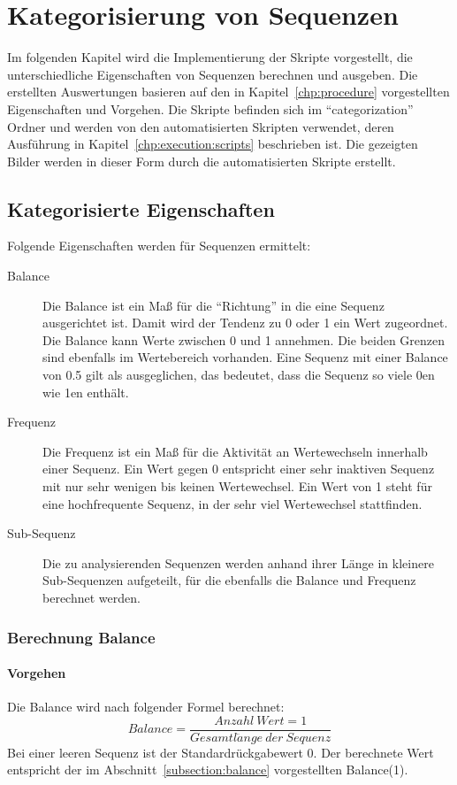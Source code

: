 \chapter{Kategorisierung von Sequenzen}
\label{chp:categorization}
Im folgenden Kapitel wird die Implementierung der Skripte vorgestellt, die unterschiedliche Eigenschaften von Sequenzen berechnen und ausgeben.
Die erstellten Auswertungen basieren auf den in Kapitel~\ref{chp:procedure} vorgestellten Eigenschaften und Vorgehen.
Die Skripte befinden sich im \enquote{categorization} Ordner und werden von den automatisierten Skripten verwendet, deren Ausführung in Kapitel~\ref{chp:execution:scripts} beschrieben ist.
Die gezeigten Bilder werden in dieser Form durch die automatisierten Skripte erstellt.
\section{Kategorisierte Eigenschaften}
Folgende Eigenschaften werden für Sequenzen ermittelt:
\begin{description}
	\item[Balance] Die Balance ist ein Maß für die \enquote{Richtung} in die eine Sequenz ausgerichtet ist. Damit wird der Tendenz zu 0 oder 1 ein Wert zugeordnet. Die Balance kann Werte zwischen 0 und 1 annehmen. Die beiden Grenzen sind ebenfalls im Wertebereich vorhanden. Eine Sequenz mit einer Balance von 0.5 gilt als ausgeglichen, das bedeutet, dass die Sequenz so viele 0en wie 1en enthält.
	\item[Frequenz] Die Frequenz ist ein Maß für die Aktivität an Wertewechseln innerhalb einer Sequenz. Ein Wert gegen 0 entspricht einer sehr inaktiven Sequenz mit nur sehr wenigen bis keinen Wertewechsel. Ein Wert von 1 steht für eine hochfrequente Sequenz, in der sehr viel Wertewechsel stattfinden.
	\item[Sub-Sequenz] Die zu analysierenden Sequenzen werden anhand ihrer Länge in kleinere Sub-Sequenzen aufgeteilt, für die ebenfalls die Balance und Frequenz berechnet werden.
\end{description}

\subsection{Berechnung Balance}

\subsubsection{Vorgehen}
Die Balance wird nach folgender Formel berechnet:
\[
Balance = \frac{Anzahl\ Wert = 1}{Gesamtl\ddot{a}nge\ der\ Sequenz}
\]
Bei einer leeren Sequenz ist der Standardrückgabewert 0.
Der berechnete Wert entspricht der im Abschnitt~\ref{subsection:balance} vorgestellten Balance(1).
